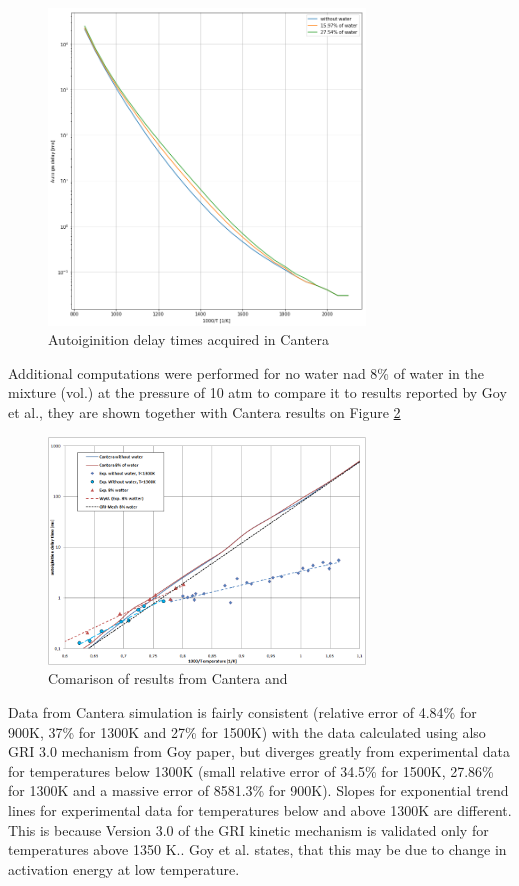 \documentclass[a4paper]{article}
\begin{document}
\begin{figure}[H]
\centering
\includegraphics[width=0.75\textwidth]{2_adt_to_T_b.png}
\caption{\label{fig:2_3}Autoiginition delay times acquired in Cantera}
\end{figure}

Additional computations were performed for no water nad 8\% of water in the mixture (vol.) at the pressure of 10 atm to compare it to results reported by Goy et al.\cite{Goy2001}, they are shown together with Cantera results on Figure \ref{fig:2_goy}
\begin{figure}[H]
\centering
\includegraphics[width=0.75\textwidth]{2_whole_graph_slopes.png}
\caption{\label{fig:2_goy}Comarison of results from Cantera and \cite{Goy2001}}
\end{figure}
Data from Cantera simulation is fairly consistent (relative error of 4.84\% for 900K, 37\% for 1300K and 27\% for 1500K) with the data calculated using also GRI 3.0 mechanism from Goy paper, but diverges greatly from experimental data for temperatures below 1300K (small relative error of 34.5\% for 1500K, 27.86\% for 1300K and a massive error of 8581.3\% for 900K). Slopes for exponential trend lines for experimental data for temperatures below and above 1300K are different. This is because Version 3.0 of the GRI kinetic mechanism is validated only for temperatures above 1350 K.\cite{Goy2001}. Goy et al. states, that this may be due to change in activation energy at low temperature.
\end{document}
